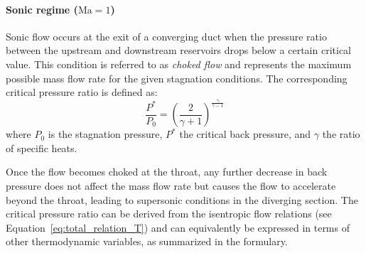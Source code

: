 	\paragraph{Sonic regime ($\mathrm{Ma} = 1$)}
		Sonic flow occurs at the exit of a converging duct when the pressure ratio between the upstream and downstream reservoirs drops below a certain critical value. 
		This condition is referred to as \emph{choked flow} and represents the maximum possible mass flow rate for the given stagnation conditions. 
		The corresponding critical pressure ratio is defined as:
		\begin{equation}
			\frac{P^*}{P_0}=\left(\frac{2}{\gamma + 1}\right)^{\frac{\gamma}{\gamma - 1}}
			\label{eq:critical-pressure}
		\end{equation}
		where $P_0$ is the stagnation pressure, $P^*$ the critical back pressure, and $\gamma$ the ratio of specific heats.

		Once the flow becomes choked at the throat, any further decrease in back pressure does not affect the mass flow rate but causes the flow to accelerate beyond the throat, leading to supersonic conditions in the diverging section. 
		The critical pressure ratio can be derived from the isentropic flow relations (see Equation~\eqref{eq:total_relation_T}) and can equivalently be expressed in terms of other thermodynamic variables, as summarized in the formulary.

